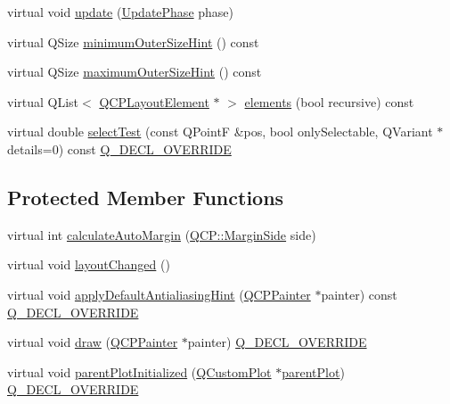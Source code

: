 \begin{DoxyCompactItemize}
virtual void \mbox{\hyperlink{class_q_c_p_layout_element_a929c2ec62e0e0e1d8418eaa802e2af9b}{update}} (\mbox{\hyperlink{class_q_c_p_layout_element_a0d83360e05735735aaf6d7983c56374d}{Update\+Phase}} phase)
\item 
virtual Q\+Size \mbox{\hyperlink{class_q_c_p_layout_element_a46789036c4fcb190fa374f91321d7c09}{minimum\+Outer\+Size\+Hint}} () const
\item 
virtual Q\+Size \mbox{\hyperlink{class_q_c_p_layout_element_ad96efb977a26e360e8a64a4c1e56456d}{maximum\+Outer\+Size\+Hint}} () const
\item 
virtual Q\+List$<$ \mbox{\hyperlink{class_q_c_p_layout_element}{Q\+C\+P\+Layout\+Element}} $\ast$ $>$ \mbox{\hyperlink{class_q_c_p_layout_element_a76dec8cb31e498994a944d7647a43309}{elements}} (bool recursive) const
\item 
virtual double \mbox{\hyperlink{class_q_c_p_layout_element_ae97f483cccedadbf18ea4525ef240ee4}{select\+Test}} (const Q\+PointF \&pos, bool only\+Selectable, Q\+Variant $\ast$details=0) const \mbox{\hyperlink{qcustomplot_8h_a42cc5eaeb25b85f8b52d2a4b94c56f55}{Q\+\_\+\+D\+E\+C\+L\+\_\+\+O\+V\+E\+R\+R\+I\+DE}}
\end{DoxyCompactItemize}
\subsection*{Protected Member Functions}
\begin{DoxyCompactItemize}
\item 
virtual int \mbox{\hyperlink{class_q_c_p_layout_element_a005c9f0fe84bc1591a2cf2c46fd477b4}{calculate\+Auto\+Margin}} (\mbox{\hyperlink{namespace_q_c_p_a7e487e3e2ccb62ab7771065bab7cae54}{Q\+C\+P\+::\+Margin\+Side}} side)
\item 
virtual void \mbox{\hyperlink{class_q_c_p_layout_element_a765f041a73af0c2de41b41a5a03e31a4}{layout\+Changed}} ()
\item 
virtual void \mbox{\hyperlink{class_q_c_p_layout_element_a0a8f18141bcf46cf40ad4c13324ff346}{apply\+Default\+Antialiasing\+Hint}} (\mbox{\hyperlink{class_q_c_p_painter}{Q\+C\+P\+Painter}} $\ast$painter) const \mbox{\hyperlink{qcustomplot_8h_a42cc5eaeb25b85f8b52d2a4b94c56f55}{Q\+\_\+\+D\+E\+C\+L\+\_\+\+O\+V\+E\+R\+R\+I\+DE}}
\item 
virtual void \mbox{\hyperlink{class_q_c_p_layout_element_ad1c597b1d608cfdd86e7b76819a94cfb}{draw}} (\mbox{\hyperlink{class_q_c_p_painter}{Q\+C\+P\+Painter}} $\ast$painter) \mbox{\hyperlink{qcustomplot_8h_a42cc5eaeb25b85f8b52d2a4b94c56f55}{Q\+\_\+\+D\+E\+C\+L\+\_\+\+O\+V\+E\+R\+R\+I\+DE}}
\item 
virtual void \mbox{\hyperlink{class_q_c_p_layout_element_ab4bb5c5a958451f5f153fdce350f13cf}{parent\+Plot\+Initialized}} (\mbox{\hyperlink{class_q_custom_plot}{Q\+Custom\+Plot}} $\ast$\mbox{\hyperlink{class_q_c_p_layerable_a473edb813a4c1929d6b6a8fe3ff3faf7}{parent\+Plot}}) \mbox{\hyperlink{qcustomplot_8h_a42cc5eaeb25b85f8b52d2a4b94c56f55}{Q\+\_\+\+D\+E\+C\+L\+\_\+\+O\+V\+E\+R\+R\+I\+DE}}
\end{DoxyCompactItemize}
